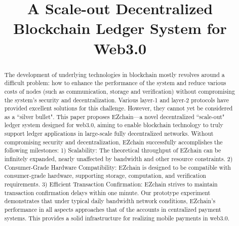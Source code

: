 \documentclass[conference]{IEEEtran}
\begin{document}
\title{A Scale-out Decentralized Blockchain Ledger System for Web3.0\\
}

\author{
\and
{}
\and
{}
}

\maketitle

\begin{abstract}
The development of underlying technologies in blockchain mostly revolves around a difficult problem: how to enhance the performance of the system and reduce various costs of nodes (such as communication, storage and verification) without compromising the system's security and decentralization. Various layer-1 and layer-2 protocols have provided excellent solutions for this challenge. However, they cannot yet be considered as a ``silver bullet". This paper proposes EZchain---a novel decentralized ``scale-out" ledger system designed for web3.0, aiming to enable blockchain technology to truly support ledger applications in large-scale fully decentralized networks. Without compromising security and decentralization, EZchain successfully accomplishes the following milestones: 1) Scalability: The theoretical throughput of EZchain can be infinitely expanded, nearly unaffected by bandwidth and other resource constraints. 2) Consumer-Grade Hardware Compatibility: EZchain is designed to be compatible with consumer-grade hardware, supporting storage, computation, and verification requirements. 3) Efficient Transaction Confirmation: EZchain strives to maintain transaction confirmation delays within one minute.
Our prototype experiment demonstrates that under typical daily bandwidth network conditions, EZchain's performance in all aspects approaches that of the accounts in centralized payment systems. This provides a solid infrastructure for realizing mobile payments in web3.0.
\end{abstract}
\end{document}
